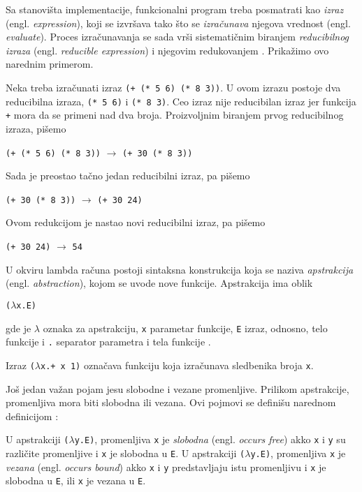 Sa stanovišta implementacije, funkcionalni program treba posmatrati kao \textit{izraz} (engl. \textit{expression}), koji se izvršava tako što se \textit{izračunava} njegova vrednost (engl. \textit{evaluate}). Proces izračunavanja se sada vrši sistematičnim biranjem \textit{reducibilnog izraza} (engl. \textit{reducible expression}) i njegovim redukovanjem \cite{the-implementation-of-functional-programming-languages}. Prikažimo ovo narednim primerom.

\begin{primer}
	Neka treba izračunati izraz \verb|(+ (* 5 6) (* 8 3))|. U ovom izrazu postoje dva reducibilna izraza, \verb|(* 5 6)| i \verb|(* 8 3)|. Ceo izraz nije reducibilan izraz jer funkcija \verb|+| mora da se primeni nad dva broja. Proizvoljnim biranjem prvog reducibilnog izraza, pišemo
	\begin{center}
		\verb|(+ (* 5 6) (* 8 3))| $\rightarrow$ \verb|(+ 30 (* 8 3))|
	\end{center}
	Sada je preostao tačno jedan reducibilni izraz, pa pišemo
	\begin{center}
		\verb|(+ 30 (* 8 3))| $\rightarrow$ \verb|(+ 30 24)|
	\end{center}
	Ovom redukcijom je nastao novi reducibilni izraz, pa pišemo
	\begin{center}
		\verb|(+ 30 24)| $\rightarrow$ \verb|54|
	\end{center}
\end{primer}


U okviru lambda računa postoji sintaksna konstrukcija koja se naziva \textit{apstrakcija} (engl. \textit{abstraction}), kojom se uvode nove funkcije. Apstrakcija ima oblik
\begin{center}
	\verb|(|$\lambda$\verb|x.E)|
\end{center} 
gde je $\lambda$ oznaka za apstrakciju, \verb|x| parametar funkcije, \verb|E| izraz, odnosno, telo funkcije i \verb|.| separator parametra i tela funkcije \cite{the-implementation-of-functional-programming-languages}.  
\begin{primer}
	Izraz \verb|(|$\lambda$\verb|x.+ x 1)| označava funkciju koja izračunava sledbenika broja \verb|x|.
\end{primer}


Još jedan važan pojam jesu slobodne i vezane promenljive. Prilikom apstrakcije, promenljiva mora biti slobodna ili vezana. Ovi pojmovi se definišu narednom definicijom \cite{the-implementation-of-functional-programming-languages}:

\begin{definicija}
	U apstrakciji \verb|(|$\lambda$\verb|y.E)|, promenljiva \verb|x| je \textit{slobodna} (engl. \textit{occurs free}) akko \verb|x| i \verb|y| su različite promenljive i \verb|x| je slobodna u \verb|E|. U apstrakciji \verb|(|$\lambda$\verb|y.E)|, promenljiva \verb|x| je \textit{vezana} (engl. \textit{occurs bound}) akko \verb|x| i \verb|y| predstavljaju istu promenljivu i \verb|x| je slobodna u \verb|E|, ili \verb|x| je vezana u \verb|E|.
\end{definicija}

